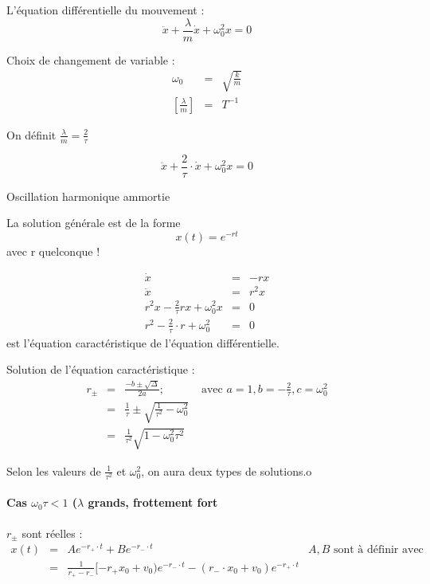 	L'équation différentielle du mouvement : \[\ddot{x} + \frac{\lambda}{m} \dot{x} + \omega_0^2 x = 0\]

	Choix de changement de variable :
	\[\begin{array}{rcl}
			\omega_0 &=& \sqrt{\frac{k}{m}} \\
	{[\frac{\lambda}{m}]} &=& T^{-1}\end{array}\]

	On définit $\frac{\lambda}{m} = \frac{2}{\tau}$

	\[\ddot{x} + \frac{2}{\tau}\cdot \dot{x} + \omega_0^2 x = 0\]

	Oscillation harmonique ammortie

	La solution générale est de la forme \[x(t) = e^{-rt}\] avec r quelconque !

	\[\begin{array}{rcl}
			\dot{x} &=& -rx \\
			\ddot{x} &=& r^2 x \\
			r^2 x - \frac{2}{\tau} rx + \omega_0^2 x &=& 0\\
	r^2 - \frac{2}{\tau}\cdot r + \omega_0^2 &=& 0\end{array}\] est l'équation caractéristique de l'équation différentielle.

	Solution de l'équation caractéristique :
	\[\begin{array}{rclr}
		r_{\pm} &=& \frac{-b \pm \sqrt{\Delta}}{2a}; &  \text{ avec } a=1, b=-\frac{2}{\tau}, c = \omega_0^2 \\
							   &=& \frac{1}{\tau} \pm  \sqrt{\frac{1}{\tau^2} - \omega_0^2} \\
			&=& \frac{1}{\tau^2} \sqrt{1 - \omega_0^2 \tau^2}\end{array}\]

	Selon les valeurs de $\frac{1}{\tau^2}$ et $\omega_0^2$, on aura deux types de solutions.o
	\paragraph{Cas $\omega_0 \tau < 1$ ($\lambda$ grands, frottement fort}

	$r_{\pm}$ sont réelles :
	\[\begin{array}{rccl}
			x(t) &=& Ae^{-r_+\cdot t} + Be^{-r_- \cdot t} & A, B\text{ sont à définir avec les conditions initiales }\\
			   &=& \frac{1}{r_+ - r_-} [-r_+ x_0 + v_0)e^{-r_- \cdot t} - (r_- \cdot x_0 + v_0)e^{-r_+ \cdot t}
	\end{array}\]

